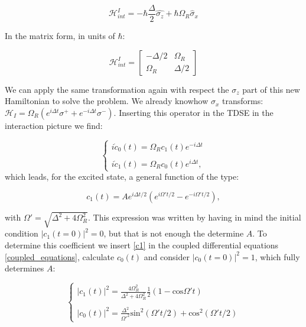 \begin{equation} \label{h_int}
    \mathcal{H}_{int}^{I} = - \hbar \frac{\Delta}{2} \hat{\sigma_{z}} + \hbar\Omega_{R} \hat{\sigma}_{x}
\end{equation}

In the matrix form, in units of $\hbar$:

\[
\mathcal{H}_{int}^{I} =
  \begin{bmatrix}
    - \Delta / 2 & \Omega_{R}  \\
    \Omega_{R} & \Delta / 2
  \end{bmatrix}
\]

We can apply the same transformation again with respect the $\sigma_{z}$ part of this new Hamiltonian to solve the problem. We already knowhow $\sigma_{x}$ transforms: $\mathcal{H}_{I} = \Omega_{R} (e^{i\Delta t} \sigma^{+} + e^{-i\Delta t} \sigma^{-})$.
Inserting this operator in the TDSE in the interaction picture we find:

\begin{equation} \label{coupled_equations}
\begin{cases}
    i \dot{c}_{0}(t) = \Omega_{R} c_{1}(t) e^{-i \Delta t} \\
    \\
    i \dot{c}_{1}(t) = \Omega_{R} c_{0}(t) e^{i \Delta t},
\end{cases}
\end{equation}
which leads, for the excited state, a general function of the type:

\begin{equation} \label{c1}
    c_{1}(t) = A e^{i\Delta t / 2}(e^{i\Omega't/2} - e^{-i\Omega't/2}),
\end{equation}

with $\Omega' = \sqrt{\Delta^{2} + 4 \Omega_{R}^{2}}$. This expression was written by having in mind the initial condition $|c_{1}(t=0)|^{2} = 0$, but that is not enough the determine $A$. To determine this coefficient we insert \ref{c1} in the coupled differential equations \ref{coupled_equations}, calculate $c_{0}(t)$ and consider $|c_{0}(t=0)|^{2} = 1$, which fully determines $A$:

\begin{equation}
    \begin{cases}
    |c_{1}(t)|^{2} = \frac{4\Omega_{R}^{2}}{\Delta^{2} + 4 \Omega_{R}^{2}} \frac{1}{2}(1 - \textrm{cos} \Omega't) \\
    \\
    |c_{0}(t)|^{2} = \frac{\Delta^{2}} {\Omega'^{2}} \textrm{sin}^{2}(\Omega't/2) + \textrm{cos}^{2}(\Omega't/2)
    \end{cases}
\end{equation}

